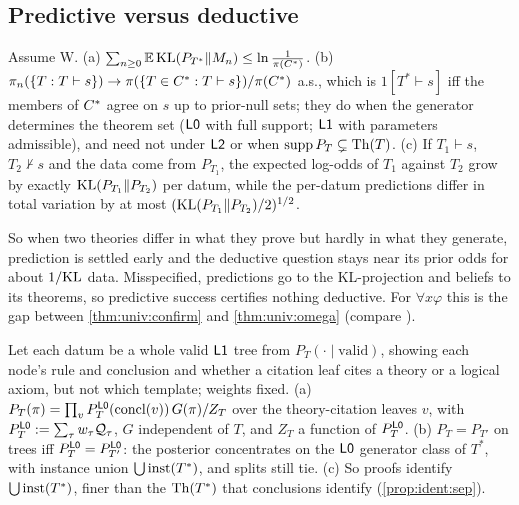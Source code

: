 \subsection{Predictive versus deductive}\label{sec:ident:pred}

\begin{theorem}\identbrk{}\label{thm:ident:predded}
Assume W. (a) $\sum_{n\ge0}\mathbb{E}\,\mathrm{KL}(P_{T^*}\|M_n)\le\ln\frac1{\pi(C^{*})}$. (b) $\pi_n(\{T:T\vdash s\})\to\pi(\{T\in C^{*}:T\vdash s\})/\pi(C^{*})$ a.s., which is $1[T^*\vdash s]$ iff the members of $C^{*}$ agree on $s$ up to prior-null sets; they do when the generator determines the theorem set ($\mathord{\mathsf{L0}}$ with full support; $\mathord{\mathsf{L1}}$ with parameters admissible), and need not under $\mathord{\mathsf{L2}}$ or when $\operatorname{supp}P_T\subsetneq\mathrm{Th}(T)$. (c) If $T_1\vdash s$, $T_2\nvdash s$ and the data come from $P_{T_1}$, the expected log-odds of $T_1$ against $T_2$ grow by exactly $\mathrm{KL}(P_{T_1}\|P_{T_2})$ per datum, while the per-datum predictions differ in total variation by at most $(\mathrm{KL}(P_{T_1}\|P_{T_2})/2)^{1/2}$.
\end{theorem}

\noindent So when two theories differ in what they prove but hardly in what they generate, prediction is settled early and the deductive question stays near its prior odds for about $1/\mathrm{KL}$ data. Misspecified, predictions go to the KL-projection and beliefs to its theorems, so predictive success certifies nothing deductive. For $\forall x\varphi$ this is the gap between \cref{thm:univ:confirm} and \cref{thm:univ:omega} (compare \citealp{hutter2007universal}).

\begin{proposition}\identbrk{}\label{prop:ident:proofs}
Let each datum be a whole valid $\mathord{\mathsf{L1}}$ tree from $P_T(\cdot\mid\text{valid})$, showing each node's rule and conclusion and whether a citation leaf cites a theory or a logical axiom, but not which template; weights fixed. (a) $P_T(\pi)=\prod_vP^{\mathord{\mathsf{L0}}}_T(\mathrm{concl}(v))\,G(\pi)/Z_T$ over the theory-citation leaves $v$, with $P^{\mathord{\mathsf{L0}}}_T:=\sum_\tau w_\tau\mathcal{Q}_\tau$, $G$ independent of $T$, and $Z_T$ a function of $P^{\mathord{\mathsf{L0}}}_T$. (b) $P_T=P_{T'}$ on trees iff $P^{\mathord{\mathsf{L0}}}_T=P^{\mathord{\mathsf{L0}}}_{T'}$: the posterior concentrates on the $\mathord{\mathsf{L0}}$ generator class of $T^*$, with instance union $\bigcup\mathrm{inst}(T^*)$, and splits still tie. (c) So proofs identify $\bigcup\mathrm{inst}(T^*)$, finer than the $\mathrm{Th}(T^*)$ that conclusions identify (\cref{prop:ident:sep}).
\end{proposition}

